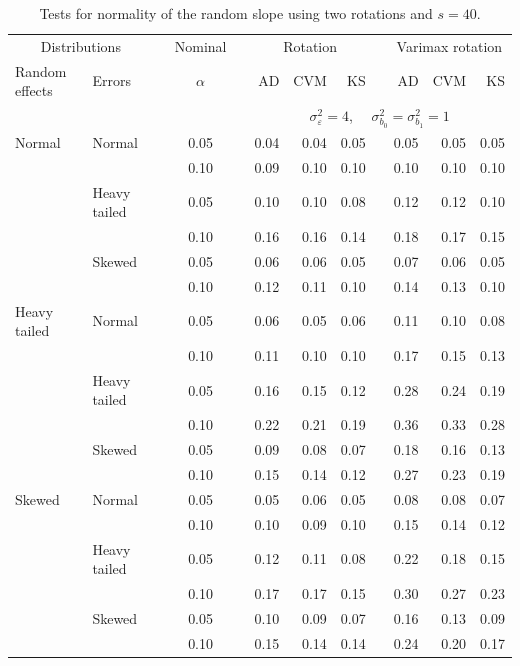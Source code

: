 \documentclass[12pt]{article} %
\begin{document}
\begin{table}[ht]
\caption{Tests for normality of the random slope using two rotations and $s = 40$.}
\begin{scriptsize}
\begin{center}
\begin{tabular}{ll p{.1cm} c p{.1cm} rrr p{.1cm} rrr}
  \hline
  \multicolumn{2}{c}{Distributions}& & Nominal & &  \multicolumn{3}{c}{Rotation} & & \multicolumn{3}{c}{Varimax rotation} \\ \cline{1-2} \cline{6-8} \cline{10-12}   
  Random effects & Errors & & $\alpha$ & & AD & CVM & KS & & AD & CVM & KS \\ 
   \hline
& && && \multicolumn{7}{c}{$\sigma_{\varepsilon}^2 = 4$, \ \ $\sigma_{b_0}^2 = \sigma_{b_1}^2 = 1$} \\ \cline{6-12}
Normal       & Normal       && 0.05 &&  0.04 & 0.04 & 0.05 && 0.05 & 0.05 & 0.05 \\ 
             &              && 0.10 &&  0.09 & 0.10 & 0.10 && 0.10 & 0.10 & 0.10 \\ 
             & Heavy tailed && 0.05 &&  0.10 & 0.10 & 0.08 && 0.12 & 0.12 & 0.10 \\ 
             &              && 0.10 &&  0.16 & 0.16 & 0.14 && 0.18 & 0.17 & 0.15 \\ 
             & Skewed       && 0.05 &&  0.06 & 0.06 & 0.05 && 0.07 & 0.06 & 0.05 \\ 
             &              && 0.10 &&  0.12 & 0.11 & 0.10 && 0.14 & 0.13 & 0.10 \\ 
Heavy tailed & Normal       && 0.05 &&  0.06 & 0.05 & 0.06 && 0.11 & 0.10 & 0.08 \\ 
             &              && 0.10 &&  0.11 & 0.10 & 0.10 && 0.17 & 0.15 & 0.13 \\ 
             & Heavy tailed && 0.05 &&  0.16 & 0.15 & 0.12 && 0.28 & 0.24 & 0.19 \\ 
             &              && 0.10 &&  0.22 & 0.21 & 0.19 && 0.36 & 0.33 & 0.28 \\ 
             & Skewed       && 0.05 &&  0.09 & 0.08 & 0.07 && 0.18 & 0.16 & 0.13 \\ 
             &              && 0.10 &&  0.15 & 0.14 & 0.12 && 0.27 & 0.23 & 0.19 \\ 
Skewed       & Normal       && 0.05 &&  0.05 & 0.06 & 0.05 && 0.08 & 0.08 & 0.07 \\ 
             &              && 0.10 &&  0.10 & 0.09 & 0.10 && 0.15 & 0.14 & 0.12 \\ 
             & Heavy tailed && 0.05 &&  0.12 & 0.11 & 0.08 && 0.22 & 0.18 & 0.15 \\ 
             &              && 0.10 &&  0.17 & 0.17 & 0.15 && 0.30 & 0.27 & 0.23 \\ 
             & Skewed       && 0.05 &&  0.10 & 0.09 & 0.07 && 0.16 & 0.13 & 0.09 \\ 
             &              && 0.10 &&  0.15 & 0.14 & 0.14 && 0.24 & 0.20 & 0.17 \\ 


\end{tabular}
\end{center}
\end{scriptsize}
\end{table}
\end{document}
